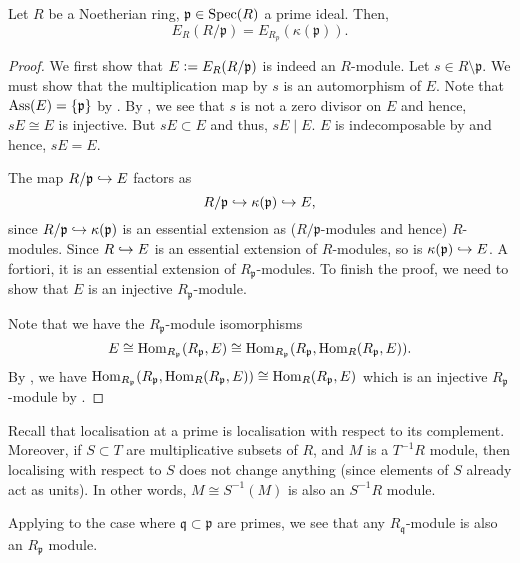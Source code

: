 \begin{thm} \label{thm:injective-hull-R-mod-p}
	Let $R$ be a Noetherian ring, $\mathfrak{p} \in \operatorname{Spec}(R)$ a prime ideal. Then,
	\begin{equation*} 
		E_{R}(R/\mathfrak{p}) = E_{R_{p}}(\kappa(\mathfrak{p})).
	\end{equation*}
\end{thm}
\begin{proof} 
	We first show that $E \vcentcolon= E_{R}(R/\mathfrak{p})$ is indeed an $R$-module. Let $s \in R \setminus \mathfrak{p}$. We must show that the multiplication map by $s$ is an automorphism of $E$. Note that $\operatorname{Ass}(E) = \{\mathfrak{p}\}$ by . By , we see that $s$ is not a zero divisor on $E$ and hence, $sE \cong E$ is injective. But $sE \subset E$ and thus, $sE \mid E$. $E$ is indecomposable by  and hence, $sE = E$.

	The map $R/\mathfrak{p} \hookrightarrow E$ factors as 
	\begin{equation*} 
		R/\mathfrak{p} \hookrightarrow \kappa(\mathfrak{p}) \hookrightarrow E,
	\end{equation*} 
	since $R/\mathfrak{p} \hookrightarrow \kappa(\mathfrak{p})$ is an essential extension as ($R/\mathfrak{p}$-modules and hence) $R$-modules. Since $R \hookrightarrow E$ is an essential extension of $R$-modules, so is $\kappa(\mathfrak{p}) \hookrightarrow E$. A fortiori, it is an essential extension of $R_{\mathfrak{p}}$-modules. To finish the proof, we need to show that $E$ is an injective $R_{\mathfrak{p}}$-module.

	Note that we have the $R_{\mathfrak{p}}$-module isomorphisms
	\begin{equation*} 
		E \cong \operatorname{Hom}_{R_{\mathfrak{p}}}(R_{\mathfrak{p}}, E) \cong \operatorname{Hom}_{R_{\mathfrak{p}}}(R_{\mathfrak{p}}, \operatorname{Hom}_{R}(R_{\mathfrak{p}}, E)).
	\end{equation*}
	By , we have $\operatorname{Hom}_{R_{\mathfrak{p}}}(R_{\mathfrak{p}}, \operatorname{Hom}_{R}(R_{\mathfrak{p}}, E)) \cong \operatorname{Hom}_{R}(R_{\mathfrak{p}}, E)$ which is an injective $R_{\mathfrak{p}}$-module by .
\end{proof}

\begin{rem} \label{rem:localising-primes-containment}
	Recall that localisation at a prime is localisation with respect to its complement. Moreover, if $S \subset T$ are multiplicative subsets of $R$, and $M$ is a $T^{-1}R$ module, then localising with respect to $S$ does not change anything (since elements of $S$ already act as units). In other words, $M \cong S^{-1}(M)$ is also an $S^{-1}R$ module.

	Applying to the case where $\mathfrak{q} \subset \mathfrak{p}$ are primes, we see that any $R_{\mathfrak{q}}$-module is also an $R_{\mathfrak{p}}$ module.
\end{rem}

